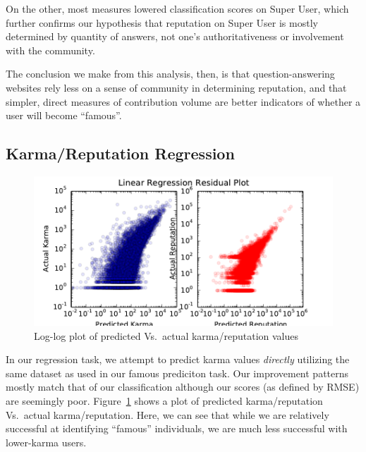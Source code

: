 \documentclass[11pt]{article}
\begin{document}
On the other, most measures lowered classification scores on Super User, which
further confirms our hypothesis that reputation on Super User is mostly
determined by quantity of answers, not one's authoritativeness or involvement
with the community.

The conclusion we make from this analysis, then, is that question-answering
websites rely less on a sense of community in determining reputation, and that
simpler, direct measures of contribution volume are better indicators of whether
a user will become ``famous''.


\subsection{Karma/Reputation Regression}
\label{sec:regression}
\begin{figure}[h]
\centering
\includegraphics[width=\linewidth]{residuals}
\caption{Log-log plot of predicted Vs.\ actual karma/reputation values}
\label{fig:residuals}
\end{figure}

In our regression task, we attempt to predict karma values \textit{directly}
utilizing the same dataset as used in our famous prediciton task. Our
improvement patterns mostly match that of our classification although our scores
(as defined by RMSE) are seemingly poor. Figure~\ref{fig:residuals} shows a plot
of predicted karma/reputation Vs.\ actual karma/reputation. Here, we can see that
while we are relatively successful at identifying ``famous'' individuals, we are
much less successful with lower-karma users.

\end{document}
